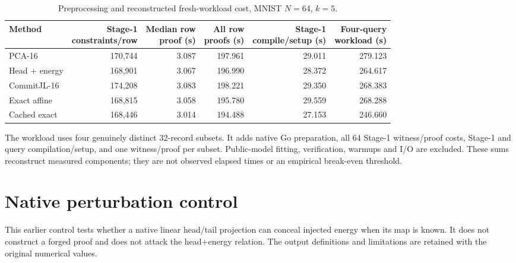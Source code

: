 \documentclass[5p,times,twocolumn]{elsarticle}
\theoremstyle{plain}
\theoremstyle{definition}
\theoremstyle{remark}
\begin{document}
\par\endgroup
\begingroup\color{RevisionGreen}
\begin{table}[!htbp]\color{RevisionGreen}
\caption{Preprocessing and reconstructed fresh-workload cost, MNIST $N=64$, $k=5$.}\label{tab:preprocessing}
\centering\small
\begin{adjustbox}{max width=\textwidth}
\begin{tabular}{@{}lrrrrr@{}}
\toprule
Method & \shortstack{Stage-1\\constraints/row} & \shortstack{Median row\\proof (s)} & \shortstack{All row\\proofs (s)} & \shortstack{Stage-1\\compile/setup (s)} & \shortstack{Four-query\\workload (s)} \\
\midrule
PCA-16 & 170,744 & 3.087 & 197.961 & 29.011 & 279.123 \\
Head + energy & 168,901 & 3.067 & 196.990 & 28.372 & 264.617 \\
CommitJL-16 & 174,208 & 3.083 & 198.221 & 29.350 & 268.383 \\
Exact affine & 168,815 & 3.058 & 195.780 & 29.559 & 268.288 \\
Cached exact & 168,446 & 3.014 & 194.488 & 27.153 & 246.660 \\
\bottomrule
\end{tabular}
\end{adjustbox}
\par\vspace{3pt}\begin{minipage}{0.98\textwidth}\footnotesize The workload uses four genuinely distinct 32-record subsets. It adds native Go preparation, all 64 Stage-1 witness/proof costs, Stage-1 and query compilation/setup, and one witness/proof per subset. Public-model fitting, verification, warmups and I/O are excluded. These sums reconstruct measured components; they are not observed elapsed times or an empirical break-even threshold.\end{minipage}
\end{table}


\par\endgroup


\FloatBarrier

\section{\textcolor{RevisionRed}{Native perturbation control}}\label{app:attack}
\begingroup\color{RevisionRed}
This earlier control tests whether a native linear head/tail projection can conceal injected energy when its map is known. It does not construct a forged proof and does not attack the head+energy relation. The output definitions and limitations are retained with the original numerical values.
\end{document}
